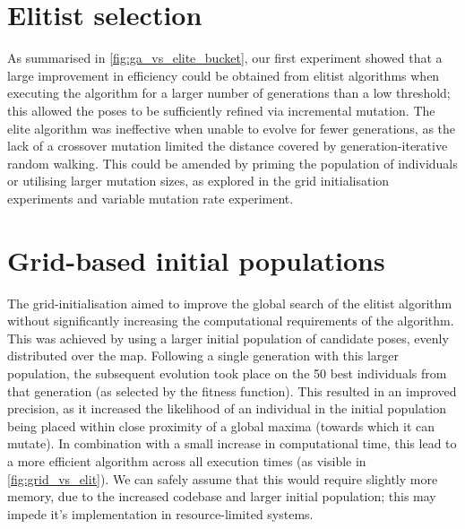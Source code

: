 \documentclass[authoryearcitations]{UoYCSproject}
\begin{document}
\section{Elitist selection}
As summarised in \autoref{fig:ga_vs_elite_bucket}, our first experiment showed that a large improvement in efficiency could be obtained from elitist algorithms when executing the algorithm for a larger number of generations than a low threshold; this allowed the poses to be sufficiently refined via incremental mutation. The elite algorithm was ineffective when unable to evolve for fewer generations, as the lack of a crossover mutation limited the distance covered by generation-iterative random walking. This could be amended by priming the population of individuals or utilising larger mutation sizes, as explored in the grid initialisation experiments and variable mutation rate experiment.

\section{Grid-based initial populations}
The grid-initialisation aimed to improve the global search of the elitist algorithm without significantly increasing the computational requirements of the algorithm. This was achieved by using a larger initial population of candidate poses, evenly distributed over the map. Following a single generation with this larger population, the subsequent evolution took place on the 50 best individuals from that generation (as selected by the fitness function). This resulted in an improved precision, as it increased the likelihood of an individual in the initial population being placed within close proximity of a global maxima (towards which it can mutate). In combination with a small increase in computational time, this lead to a more efficient algorithm across all execution times (as visible in \autoref{fig:grid_vs_elit}). We can safely assume that this would require slightly more memory, due to the increased codebase and larger initial population; this may impede it's implementation in resource-limited systems. 
\end{document}
